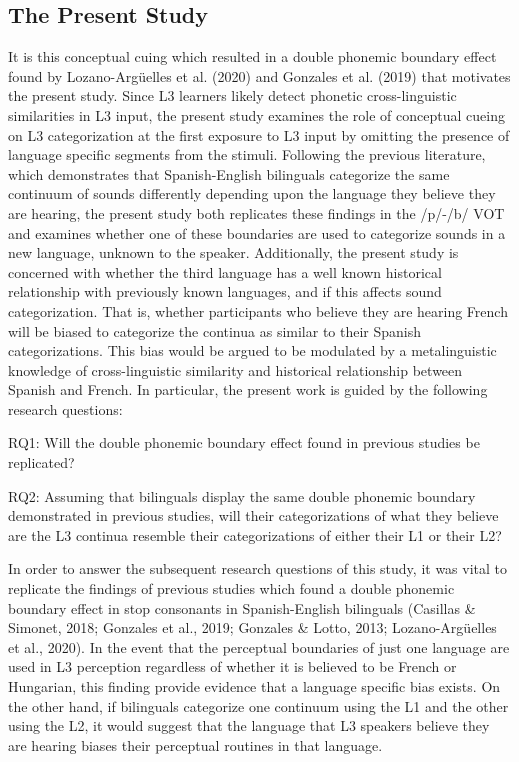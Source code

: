 \documentclass[
  man,floatsintext]{apa6}
\begin{document}
\hypertarget{the-present-study}{%
\subsection{The Present Study}\label{the-present-study}}

It is this conceptual cuing which resulted in a double phonemic boundary effect found by Lozano-Argüelles et al. (2020) and Gonzales et al. (2019) that motivates the present study.
Since L3 learners likely detect phonetic cross-linguistic similarities in L3 input, the present study examines the role of conceptual cueing on L3 categorization at the first exposure to L3 input by omitting the presence of language specific segments from the stimuli.
Following the previous literature, which demonstrates that Spanish-English bilinguals categorize the same continuum of sounds differently depending upon the language they believe they are hearing, the present study both replicates these findings in the /p/-/b/ VOT and examines whether one of these boundaries are used to categorize sounds in a new language, unknown to the speaker.
Additionally, the present study is concerned with whether the third language has a well known historical relationship with previously known languages, and if this affects sound categorization.
That is, whether participants who believe they are hearing French will be biased to categorize the continua as similar to their Spanish categorizations.
This bias would be argued to be modulated by a metalinguistic knowledge of cross-linguistic similarity and historical relationship between Spanish and French.
In particular, the present work is guided by the following research questions:

RQ1: Will the double phonemic boundary effect found in previous studies be replicated?

RQ2: Assuming that bilinguals display the same double phonemic boundary demonstrated in previous studies, will their categorizations of what they believe are the L3 continua resemble their categorizations of either their L1 or their L2?

In order to answer the subsequent research questions of this study, it was vital to replicate the findings of previous studies which found a double phonemic boundary effect in stop consonants in Spanish-English bilinguals (Casillas \& Simonet, 2018; Gonzales et al., 2019; Gonzales \& Lotto, 2013; Lozano-Argüelles et al., 2020).
In the event that the perceptual boundaries of just one language are used in L3 perception regardless of whether it is believed to be French or Hungarian, this finding provide evidence that a language specific bias exists. On the other hand, if bilinguals categorize one continuum using the L1 and the other using the L2, it would suggest that the language that L3 speakers believe they are hearing biases their perceptual routines in that language.
\end{document}
